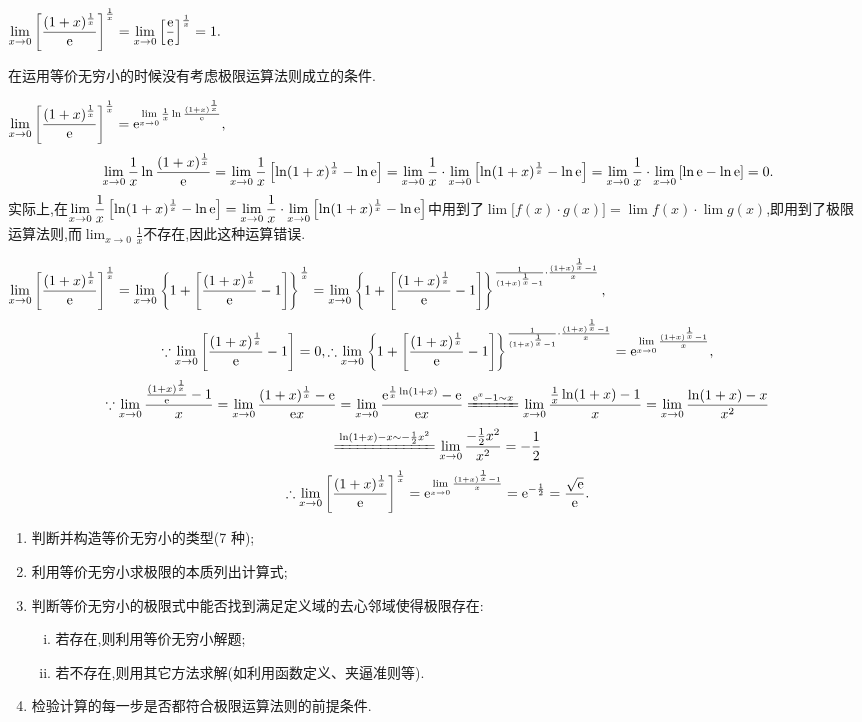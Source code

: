\errsolve $\displaystyle \lim_{x \to 0}\left[ \frac{(1+x)^{\frac{1}{x}}}{{\rm{e}}}\right]^{\frac{1}{x}}=\lim_{x \to 0}\left[ \frac{{\rm{e}}}{{\rm{e}}}\right]^{\frac{1}{x}}=1.$

\errreason 在运用等价无穷小的时候没有考虑极限运算法则成立的条件.

\solvereason $\displaystyle \lim_{x \to 0}\left[ \frac{(1+x)^{\frac{1}{x}}}{{\rm{e}}}\right]^{\frac{1}{x}}={\rm{e}}^{\lim\limits_{x \to 0}\frac{1}{x}\ln\frac{(1+x)^{\frac{1}{x}}}{{\rm{e}}}},$
\[
\lim_{x \to 0}\frac{1}{x}\ln\frac{(1+x)^{\frac{1}{x}}}{{\rm{e}}}=\lim\limits_{x \to 0}\frac{1}{x}\left[ \ln(1+x)^{\frac{1}{x}} -\ln {\rm{e}}\right]=\lim\limits_{x \to 0}\frac{1}{x}\cdot\lim\limits_{x \to 0}\left[ \ln(1+x)^{\frac{1}{x}} -\ln {\rm{e}}\right]=\lim_{x \to 0}\frac{1}{x} \cdot \lim\limits_{x \to 0} \left[ \ln {\rm{e}} -\ln {\rm{e}} \right]=0.
\]
实际上,在$\displaystyle \lim\limits_{x \to 0}\frac{1}{x}\left[ \ln(1+x)^{\frac{1}{x}}-\ln {\rm{e}} \right]=\lim\limits_{x \to 0}\frac{1}{x}\cdot\lim\limits_{x \to 0}\left[ \ln(1+x)^{\frac{1}{x}} -\ln {\rm{e}}\right]$中用到了$\lim \big[f(x)\cdot g(x)\big]=\lim f(x) \cdot \lim  g(x)$,即用到了极限运算法则,而$\displaystyle \lim_{x \to 0}\frac{1}{x}$不存在,因此这种运算错误.

\solve $\displaystyle \lim_{x \to 0}\left[ \frac{(1+x)^{\frac{1}{x}}}{{\rm{e}}}\right]^{\frac{1}{x}}=\lim_{x \to 0}\left\lbrace1+\left[\frac{(1+x)^{\frac{1}{x}}}{{\rm{e}}}-1\right]\right\rbrace^{\frac 1x}=\lim_{x \to 0}\left\lbrace1+\left[\frac{(1+x)^{\frac{1}{x}}}{{\rm{e}}}-1\right]\right\rbrace^{ \frac{1}{(1+x)^{\frac 1x}-1}\cdot \frac{(1+x)^{\frac 1x}-1}{x}},$
\[
\because \lim\limits_{x \to 0}\left[\frac{(1+x)^{\frac{1}{x}}}{{\rm{e}}}-1\right]=0,\therefore \lim_{x \to 0}\left\lbrace1+\left[\frac{(1+x)^{\frac{1}{x}}}{{\rm{e}}}-1\right]\right\rbrace^{ \frac{1}{(1+x)^{\frac 1x}-1}\cdot \frac{(1+x)^{\frac 1x}-1}{x}}={\rm{e}}^{\lim\limits_{x\to 0}\frac{(1+x)^\frac 1x-1}{x}},
\]
\[
\because \lim\limits_{x\to 0}\frac{\frac{(1+x)^\frac 1x}{\e}-1}{x}=\lim\limits_{x\to 0}\frac{(1+x)^\frac 1x-\e}{\e x}=\lim\limits_{x \to 0}\frac{\e^{\frac{1}{x}\ln(1+x)}-\e}{\e x}\xlongequal[]{\e^x-1 \sim x} \lim\limits_{x \to 0}\frac{\frac{1}{x}\ln(1+x)-1}{x}=\lim_{x \to 0}\frac{\ln (1+x)-x}{x^2}
\]
\[
\xlongequal[]{\ln(1+x)-x\sim-\frac{1}{2}x^2} \lim\limits_{x \to 0}\frac{-\frac{1}{2}x^2}{x^2}=-\frac{1}{2}
\]
\[
\therefore \lim_{x \to 0}\left[ \frac{(1+x)^{\frac{1}{x}}}{{\rm{e}}}\right]^{\frac{1}{x}}={\rm{e}}^{\lim\limits_{x\to 0}\frac{(1+x)^\frac 1x-1}{x}}={\rm{e}}^{-\frac{1}{2}}=\frac{\sqrt{{\rm{e}}}}{{\rm{e}}}.
\]

\inference[等价无穷小求极限]\sj
\begin{enumerate}
	\item 判断并构造等价无穷小的类型(7 种);
	\item 利用等价无穷小求极限的本质列出计算式;
	\item 判断等价无穷小的极限式中能否找到满足定义域的去心邻域使得极限存在:
	\begin{enumerate}[(i)]
		\item 若存在,则利用等价无穷小解题;
		\item 若不存在,则用其它方法求解(如利用函数定义、夹逼准则等).
	\end{enumerate}
	\item 检验计算的每一步是否都符合极限运算法则的前提条件.
\end{enumerate}

